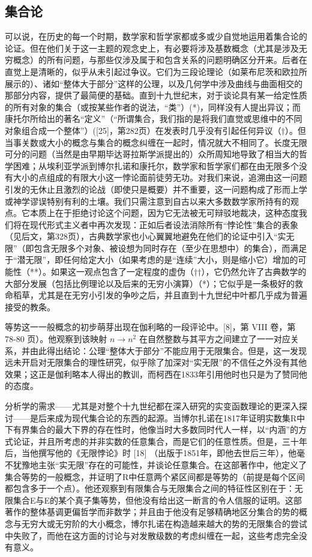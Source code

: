 \subsection*{集合论}

可以说，在历史的每一个时期，数学家和哲学家都或多或少自觉地运用着集合论的论证。但在他们关于这一主题的观念史上，有必要将涉及基数概念（尤其是涉及无穷概念）的所有问题，与那些仅涉及属于和包含关系的问题明确区分开来。后者在直觉上是清晰的，似乎从未引起过争议。它们为三段论理论（如莱布尼茨和欧拉所展示的）、诸如“整体大于部分”这样的公理，以及几何学中涉及曲线与曲面相交的那部分内容，提供了最简便的基础。直到十九世纪末，对于谈论具有某一给定性质的所有对象的集合（或按某些作者的说法，“类”）(*)，同样没有人提出异议；而康托尔所给出的著名“定义”（“所谓集合，我们指的是将我们直觉或思维中的不同对象组合成一个整体”）({[}25{]}，第282页）在发表时几乎没有引起任何异议（†）。但当事关数或大小的概念与集合的概念纠缠在一起时，情况就大不相同了。长度无限可分的问题（当然是由早期毕达哥拉斯学派提出的）众所周知地导致了相当大的哲学困难；从埃利亚学派到博尔扎诺和康托尔，数学家和哲学家们都在由无限多个没有大小的点组成的有限大小这一悖论面前徒劳无功。对我们来说，追溯由这一问题引发的无休止且激烈的论战（即使只是概要）并不重要，这一问题构成了形而上学或神学谬误特别有利的土壤。我们只需注意到自古以来大多数数学家所持有的观点。它本质上在于拒绝讨论这个问题，因为它无法被无可辩驳地裁决，这种态度我们将在现代形式主义者中再次发现：正如后者设法消除所有“悖论性”集合的表象（见后文，第328页），古典数学家也小心翼翼地避免在他们的论证中引入“实无限”（即包含无限多个对象、被设想为同时存在（至少在思想中）的集合），而满足于“潜无限”，即任何给定大小（如果考虑的是“连续”大小，则是缩小它）增加的可能性（**）。如果这一观点包含了一定程度的虚伪（††），它仍然允许了古典数学的大部分发展（包括比例理论以及后来的无穷小演算）（*）；它似乎是一条极好的救命稻草，尤其是在无穷小引发的争吵之后，并且直到十九世纪中叶都几乎成为普遍接受的教条。

等势这一一般概念的初步萌芽出现在伽利略的一段评论中。{[}8{]}，第 VIII 卷，第 78-80 页）。他观察到该映射 \(n \to n^2\) 在自然整数与其平方之间建立了一一对应关系，并由此得出结论：公理“整体大于部分”不能应用于无限集合。但是，这一发现远未开启对无限集合的理性研究，似乎除了加深对“实无限”的不信任之外没有其他效果；这正是伽利略本人得出的教训，而柯西在1833年引用他时也只是为了赞同他的态度。

分析学的需求——尤其是对整个十九世纪都在深入研究的实变函数理论的更深入探讨——是后来成为现代集合论的东西的起源。当博尔扎诺在1817年证明实数集R中下有界集合的最大下界的存在性时，他像当时大多数同时代人一样，以“内涵”的方式论证，并且所考虑的并非实数的任意集合，而是它们的任意性质。但是，三十年后，当他撰写他的《无限悖论》时 {[}18{]} （出版于1851年，即他去世后三年），他毫不犹豫地主张“实无限”存在的可能性，并谈论任意集合。在这部著作中，他定义了集合等势的一般概念，并证明了R中任意两个紧区间都是等势的（前提是每个区间都包含多于一个点）。他还观察到有限集合与无限集合之间的特征性区别在于：无限集合E与E的某个真子集等势，但他没有给出这一断言的令人信服的证明。这部著作的整体基调更偏哲学而非数学；并且由于他没有足够精确地区分集合的势的概念与无穷大或无穷阶的大小概念，博尔扎诺在构造越来越大的势的无限集合的尝试中失败了，而他在这方面的讨论与对发散级数的考虑纠缠在一起，这些考虑完全没有意义。

